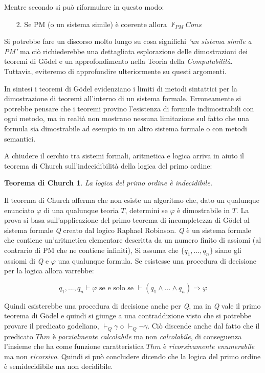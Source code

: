 \documentclass[./main.tex]{subfiles}
\begin{document}
Mentre secondo si può riformulare in questo modo:

\begin{enumerate}
  \item[2.] Se PM (o un sistema simile) è coerente allora $\nvdash_{PM} Cons$
\end{enumerate}

Si potrebbe fare un discorso molto lungo su cosa significhi \textit{'un sistema simile a PM'} ma 
ciò richiederebbe una dettagliata esplorazione delle dimostrazioni dei teoremi di
Gödel e un approfondimento nella Teoria della \textit{Computabilità}. Tuttavia, eviteremo di approfondire ulteriormente su questi argomenti.

In sintesi i teoremi di Gödel evidenziano i limiti di metodi sintattici per la dimostrazione di teoremi all'interno di un sistema formale.
Erroneamente si potrebbe pensare che i teoremi provino l'esistenza di formule indimostrabili con ogni metodo,
ma in realtà non mostrano nessuna limitazione sul fatto che una formula sia dimostrabile ad esempio in un altro sistema formale o con metodi semantici.

A chiudere il cerchio tra sistemi formali, aritmetica e logica arriva in aiuto il teorema di Church sull'indecidibilità 
della logica del primo ordine:

\newtheorem{theorem}{Teorema di Church}
\begin{theorem}
  La logica del primo ordine è indecidibile.
\end{theorem}

Il teorema di Church afferma che non esiste un algoritmo che, dato un qualunque enunciato $\varphi$ di una qualunque teoria $T$,
determini se $\varphi$ è dimostrabile in $T$.
La prova si basa sull'applicazione del primo teorema di incompletezza di Gödel al sistema formale \textit{Q}
creato dal logico Raphael Robinson. 
\textit{Q} è un sistema formale che contiene un'aritmetica elementare descritta da un numero finito di assiomi (al contrario di PM che ne contiene infiniti),
Si assuma che $\{q_1, ..., q_n\}$ siano gli assiomi di \textit{Q} e $\varphi$ una qualunque formula.
Se esistesse una procedura di decisione per la logica allora varrebbe:

$$ q_1, ..., q_n \vdash \varphi \text{ se e solo se } \vdash (q_1 \land ... \land q_n) \Rightarrow \varphi$$

Quindi esisterebbe una procedura di decisione anche per \textit{Q},
ma in \textit{Q} vale il primo teorema di Gödel e quindi si giunge a una contraddizione visto che 
si potrebbe provare il predicato godeliano, $\vdash_{Q} \gamma$ o $\vdash_Q \lnot\gamma$.
Ciò discende anche dal fatto che il predicato $Thm$ è \textit{parzialmente calcolabile} ma non \textit{calcolabile},
di conseguenza l'insieme che ha come funzione caratteristica $Thm$ è \textit{ricorsivamente enumerabile} ma non \textit{ricorsivo}.
Quindi si può concludere dicendo che la logica del primo ordine è semidecidibile ma non decidibile.
\end{document}
